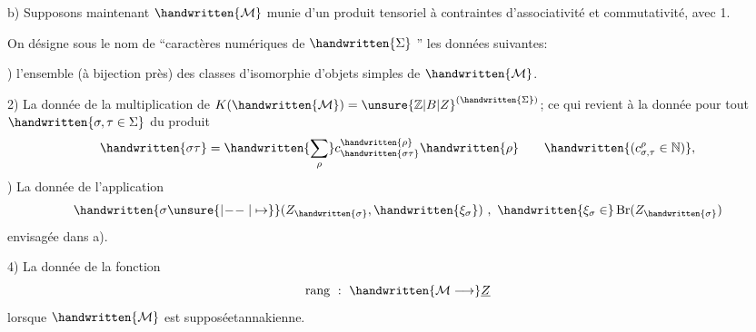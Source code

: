 b) Supposons maintenant $\handwritten{\mathcal{M}}$  munie d'un produit tensoriel à contraintes d'associativité et commutativité, avec 1.

On désigne sous le nom de ``caractères numériques de $\handwritten{\Sigma}$ '' les données suivantes:

) l'ensemble (à bijection près)\inserted{\handwritten{$\Sigma$}} des  classes d'isomorphie d'objets simples de $\handwritten{\mathcal{M}}$.

2) La donnée de la multiplication de $K(\handwritten{\mathcal{M}})={\unsure{\mathbb{Z}|B|Z}}^{(\handwritten{\Sigma})}$; ce qui revient à la donnée pour tout $\handwritten{\sigma,\tau\in\Sigma}$ du produit
\[
\handwritten{\sigma\tau}=\handwritten{\sum_\rho}c_{\handwritten{\sigma\tau}}^{\handwritten{\rho}}\handwritten{\rho}\qquad\handwritten{(c_{\sigma,\tau}^{\rho}\in\mathbb{N})},
\]
) La donnée de l'application
\[
\handwritten{\sigma\unsure{\mathrel{\vert\! -\! -}|\mapsto}}(Z_{\handwritten{\sigma}},\handwritten{\xi_\sigma})\ ,\ \handwritten{\xi_\sigma\in}\operatorname{Br}(Z_{\handwritten{\sigma}})
\]
envisagée dans a).

4) La donnée de la fonction
\[
\operatorname{rang}\ :\ \handwritten{\mathcal{M}\longrightarrow}\underline{Z}
\]
lorsque $\handwritten{\mathcal{M}}$ est supposéetannakienne.

